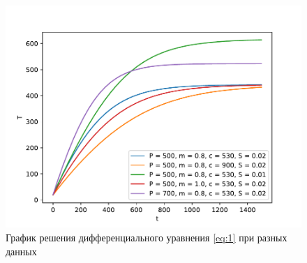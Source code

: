 \documentclass[a4paper, 14pt]{extarticle}
\begin{document}
			\begin{figure}[H]
				\centering
				\includegraphics[width = \linewidth]{fig1.pdf}
				\caption[.] {График решения дифференциального уравнения \eqref{eq:1} при разных данных}
			\end{figure}
		\pagebreak
\end{document}
